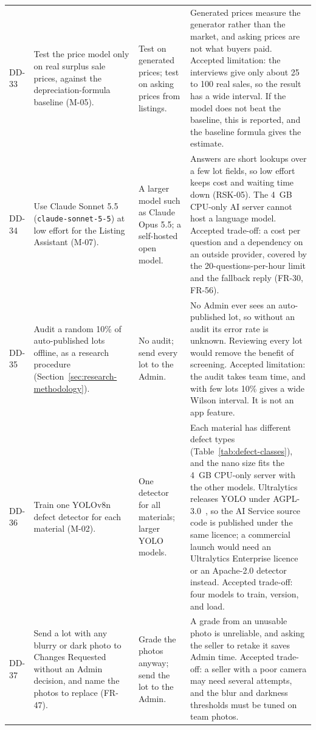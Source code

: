 {\begin{longtable}{@{}>{\raggedright\arraybackslash}p{}>{\raggedright\arraybackslash}p{}>{\raggedright\arraybackslash}p{}>{\raggedright\arraybackslash}p{}@{}}
DD-33 & Test the price model only on real surplus sale prices, against the depreciation-formula baseline (M-05). & Test on generated prices; test on asking prices from listings. & Generated prices measure the generator rather than the market, and asking prices are not what buyers paid. Accepted limitation: the interviews give only about 25 to 100 real sales, so the result has a wide interval. If the model does not beat the baseline, this is reported, and the baseline formula gives the estimate. \\
DD-34 & Use Claude Sonnet 5.5 (\texttt{claude-sonnet-5-5}) at low effort for the Listing Assistant (M-07). & A larger model such as Claude Opus 5.5; a self-hosted open model. & Answers are short lookups over a few lot fields, so low effort keeps cost and waiting time down (RSK-05). The 4~GB CPU-only AI server cannot host a language model. Accepted trade-off: a cost per question and a dependency on an outside provider, covered by the 20-questions-per-hour limit and the fallback reply (FR-30, FR-56). \\
DD-35 & Audit a random 10\% of auto-published lots offline, as a research procedure (Section~\ref{sec:research-methodology}). & No audit; send every lot to the Admin. & No Admin ever sees an auto-published lot, so without an audit its error rate is unknown. Reviewing every lot would remove the benefit of screening. Accepted limitation: the audit takes team time, and with few lots 10\% gives a wide Wilson interval. It is not an app feature. \\
DD-36 & Train one YOLOv8n defect detector for each material (M-02). & One detector for all materials; larger YOLO models. & Each material has different defect types (Table~\ref{tab:defect-classes}), and the nano size fits the 4~GB CPU-only server with the other models. Ultralytics releases YOLO under AGPL-3.0~\citep{jocher2023yolov8}, so the AI Service source code is published under the same licence; a commercial launch would need an Ultralytics Enterprise licence or an Apache-2.0 detector instead. Accepted trade-off: four models to train, version, and load. \\
DD-37 & Send a lot with any blurry or dark photo to Changes Requested without an Admin decision, and name the photos to replace (FR-47). & Grade the photos anyway; send the lot to the Admin. & A grade from an unusable photo is unreliable, and asking the seller to retake it saves Admin time. Accepted trade-off: a seller with a poor camera may need several attempts, and the blur and darkness thresholds must be tuned on team photos. \\

\end{longtable}}
